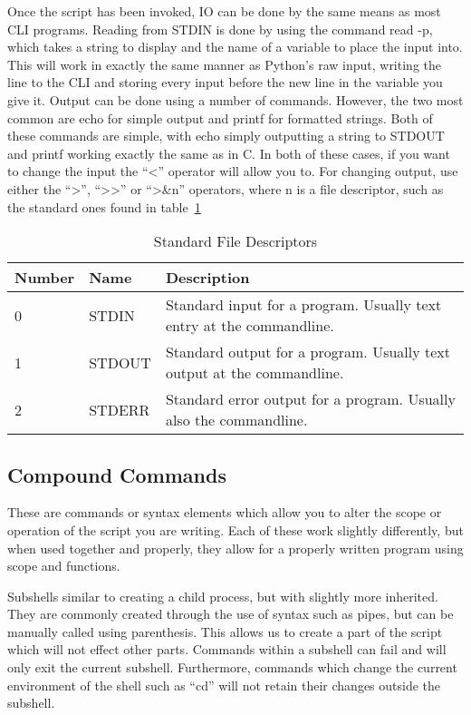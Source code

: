 			Once the script has been invoked, IO can be done by the same means as most CLI programs.
			Reading from STDIN is done by using the command read -p, which takes a string to display and the name of a variable to place the input into.
			This will work in exactly the same manner as Python's raw input, writing the line to the CLI and storing every input before the new line in the variable you give it.
			Output can be done using a number of commands.
			However, the two most common are echo for simple output and printf for formatted strings.
			Both of these commands are simple, with echo simply outputting a string to STDOUT and printf working exactly the same as in C.
			In both of these cases, if you want to change the input the ``<'' operator will allow you to.
			For changing output, use either the ``>'', ``>{}>'' or ``>\&n'' operators, where n is a file descriptor, such as the standard ones found in table~\ref{tab:stdFileDescriptors}
			\begin{table}[htb]
				\centering
				\begin{adjustbox}{max width=1\textwidth}
				\begin{tabular}{lll}
					\toprule
					\textbf{Number} & \textbf{Name} & \textbf{Description} \\
					\toprule
					0 & STDIN & Standard input for a program. Usually text entry at the commandline. \\
					1 & STDOUT & Standard output for a program. Usually text output at the commandline. \\
					2 & STDERR & Standard error output for a program. Usually also the commandline. \\
					\bottomrule
				\end{tabular}
				\end{adjustbox}
				\caption{Standard File Descriptors}
				\label{tab:stdFileDescriptors}
			\end{table}

		\subsection{Compound Commands}
			These are commands or syntax elements which allow you to alter the scope or operation of the script you are writing.
			Each of these work slightly differently, but when used together and properly, they allow for a properly written program using scope and functions.

			Subshells similar to creating a child process, but with slightly more inherited.
			They are commonly created through the use of syntax such as pipes, but can be manually called using parenthesis.
			This allows us to create a part of the script which will not effect other parts.
			Commands within a subshell can fail and will only exit the current subshell.
			Furthermore, commands which change the current environment of the shell such as ``cd'' will not retain their changes outside the subshell.

